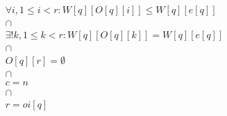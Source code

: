 \documentclass{article}
\begin{document}
\begin{verbatim}


\end{verbatim}
\begin{displaymath}
\begin{array}{c}
\forall i, 1 \leq i < r : W[q][O[q][i]] \leq W[q][e[q]] \\
\cap \\
\exists ! k, 1 \leq k < r : W[q][O[q][k]] = W[q][e[q]] \\
\cap \\
O[q][r] = \emptyset \\
\cap \\
c = n \\
\cap \\
r = oi[q]
\end{array}
\end{displaymath}
\end{document}
